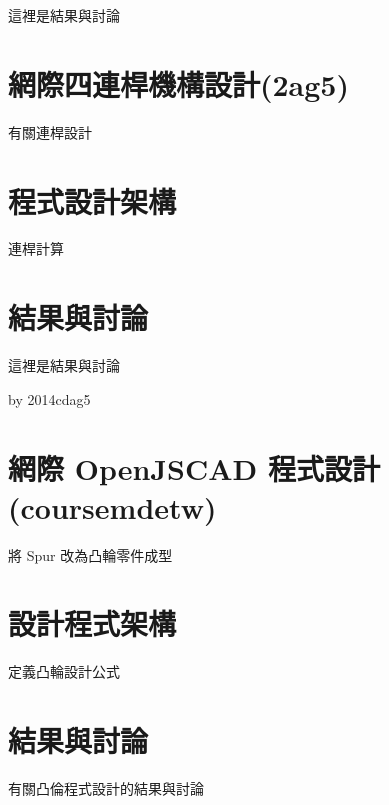 \documentclass[]{article}
\begin{document}
這裡是結果與討論

\section{網際四連桿機構設計(2ag5)}\label{ux7db2ux969bux56dbux9023ux687fux6a5fux69cbux8a2dux8a082ag5}

有關連桿設計

\section{程式設計架構}\label{ux7a0bux5f0fux8a2dux8a08ux67b6ux69cb-2}

連桿計算

\section{結果與討論}\label{ux7d50ux679cux8207ux8a0eux8ad6-3}

這裡是結果與討論

by 2014cdag5

\section{網際 OpenJSCAD
程式設計(coursemdetw)}\label{ux7db2ux969b-openjscad-ux7a0bux5f0fux8a2dux8a08coursemdetw}

將 Spur 改為凸輪零件成型

\section{設計程式架構}\label{ux8a2dux8a08ux7a0bux5f0fux67b6ux69cb-1}

定義凸輪設計公式

\section{結果與討論}\label{ux7d50ux679cux8207ux8a0eux8ad6-4}

有關凸倫程式設計的結果與討論
\end{document}
